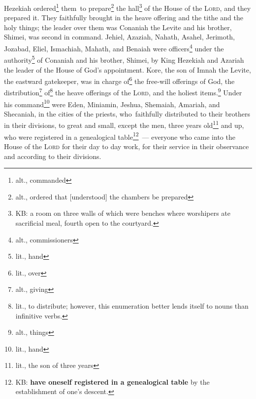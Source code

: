 \begin{inparaenum}
     Hezekiah ordered\footnote{alt., commanded} them\understood\ to prepare\footnote{alt., ordered that [understood] the chambers be prepared} the hall\footnote{KB: a room on three walls of which were benches where worshipers ate sacrificial meal, fourth open to the courtyard.} of the House of the \textsc{Lord}, and they prepared it.\understood%
     They faithfully brought in the heave offering and the tithe and the holy things; the leader over them was Conaniah the Levite and his brother, Shimei, was second in command.\understood%
     Jehiel, Azaziah, Nahath, Asahel, Jerimoth, Jozabad, Eliel, Ismachiah, Mahath, and Benaiah were officers\footnote{alt., commissioners} under the authority\footnote{lit., hand} of Conaniah and his brother, Shimei, by King Hezekiah and Azariah the leader of the House of God's appointment.%
     Kore, the son of Imnah the Levite, the eastward gatekeeper, was in charge of\footnote{lit., over} the free-will offerings of God, the distribution\footnote{alt., giving} of\footnote{lit., to distribute; however, this enumeration better lends itself to nouns than infinitive verbs.} the heave offerings of the \textsc{Lord}, and the holiest items.\footnote{alt., things}%
     Under his command\footnote{lit., hand} were Eden, Miniamin, Jeshua, Shemaiah, Amariah, and Shecaniah, in the cities of the priests, who\understood\ faithfully distributed to their brothers in their divisions, to great and small,%
     except the men, three years old\footnote{lit., the son of three years} and up, who were registered in a genealogical table\footnote{KB: \textbf{have oneself registered in a genealogical table} by the establishment of one's descent.}~--- everyone who came into the House of the \textsc{Lord} for their day to day work, for their service in their observance and according to their divisions.%
\end{inparaenum}
